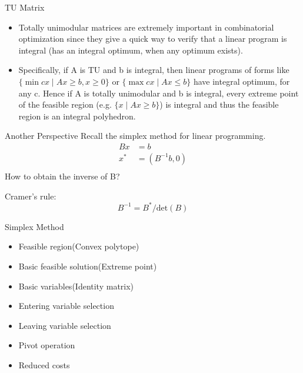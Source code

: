     \begin{frame}{TU Matrix}
      \begin{itemize}
        \item Totally unimodular matrices are extremely important in combinatorial optimization since they give a quick way to verify that a linear program is integral (has an integral optimum, when any optimum exists).
        \vspace{10pt}
        \item Specifically, if A is TU and b is integral, then linear programs of forms like $ \{\min cx\mid Ax\geq b,x\geq 0\} $ or $ \{\max cx\mid Ax\leq b\} $ have integral optimum, for any c. Hence if A is totally unimodular and b is integral, every extreme point of the feasible region (e.g. $ \{x\mid Ax\geq b\} $) is integral and thus the feasible region is an integral polyhedron.
      \end{itemize}
    \end{frame}

    \begin{frame}{Another Perspective}
      Recall the simplex method for linear programming.
      \begin{equation*}
        \begin{align}
        Bx &= b \\
        x^* &= (B^{-1}b,0) \\
        \end{align}
      \end{equation*}
      How to obtain the inverse of B?
      \begin{block}
        {Cramer's rule:}
        {\centering\[B^{-1} = B^*/\text{det}(B)\]}
      \end{block}
    \end{frame}

    \begin{frame}{Simplex Method}
      \begin{spacing}{1.5}
        \begin{itemize}
          \item Feasible region(Convex polytope)
          \item Basic feasible solution(Extreme point)
          \item Basic variables(Identity matrix)
          \item Entering variable selection
          \item Leaving variable selection
          \item Pivot operation
          \item Reduced costs
        \end{itemize}
      \end{spacing}
    \end{frame}

